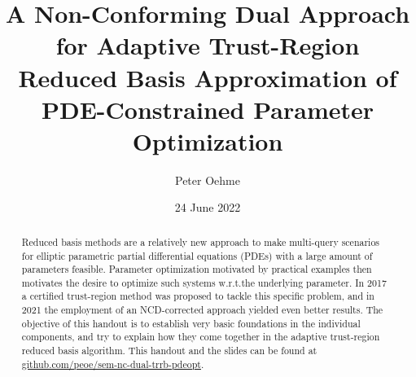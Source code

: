 \documentclass[12pt, a4paper]{article}
\title{A Non-Conforming Dual Approach for Adaptive Trust-Region Reduced Basis Approximation of PDE-Constrained Parameter Optimization}
\author{Peter Oehme}
\date{24 June 2022}
\theoremstyle{definition}
\theoremstyle{remark}
\begin{document}
\maketitle
{}
\pagestyle{plain}

\begin{abstract}
    Reduced basis methods are a relatively new approach to make multi-query scenarios for elliptic parametric partial differential equations (PDEs) with a large amount of parameters feasible.
    Parameter optimization motivated by practical examples then motivates the desire to optimize such systems w.r.t.\@ the underlying parameter.
    In 2017 a certified trust-region method was proposed to tackle this specific problem, and in 2021 the employment of an NCD-corrected approach yielded even better results.
    The objective of this handout is to establish very basic foundations in the individual components, and try to explain how they come together in the adaptive trust-region reduced basis algorithm.
    This handout and the slides can be found at \href{https://github.com/peoe/sem-nc-dual-trrb-pdeopt}{github.com/peoe/sem-nc-dual-trrb-pdeopt}.
\end{abstract}









\newpage
{}

\printbibliography{}

\newpage

\end{document}
